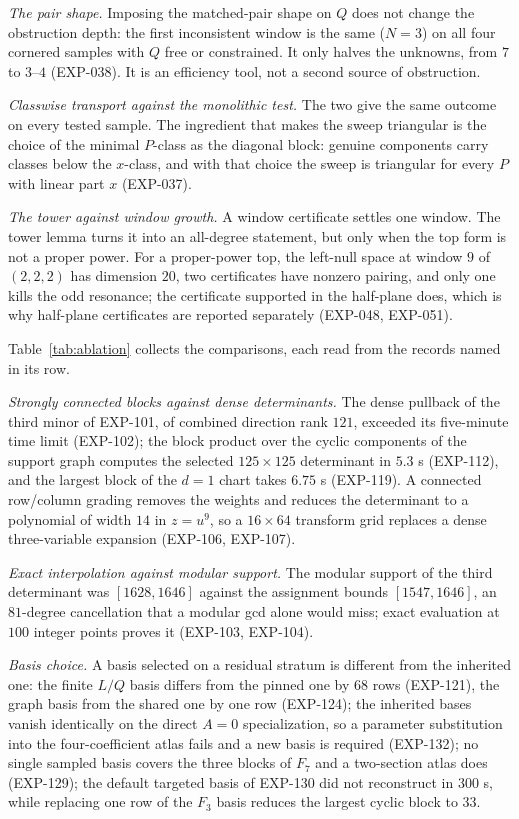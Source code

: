 \documentclass[11pt]{article}
\theoremstyle{remark}
\begin{document}
\emph{The pair shape.} Imposing the matched-pair shape on $Q$ does not change the obstruction depth: the first inconsistent window is the same ($N=3$) on all
four cornered samples with $Q$ free or constrained. It only halves the unknowns, from $7$ to $3$--$4$ (EXP-038). It is an efficiency tool, not a second source of
obstruction.

\emph{Classwise transport against the monolithic test.} The two give the same outcome on every tested sample. The ingredient that makes the sweep triangular is the choice of
the minimal $P$-class as the diagonal block: genuine components carry classes below the $x$-class, and with that choice the sweep is triangular for every $P$ with linear part $x$ (EXP-037).

\emph{The tower against window growth.} A window certificate settles one window. The tower lemma turns it into an all-degree statement, but only when the top form is not a
proper power. For a proper-power top, the left-null space at window $9$ of $(2,2,2)$ has dimension $20$, two certificates have nonzero pairing, and only one kills the odd resonance; the
certificate supported in the half-plane does, which is why half-plane certificates are reported separately (EXP-048, EXP-051).

Table~\ref{tab:ablation} collects the comparisons, each read from the records named in its row.



\emph{Strongly connected blocks against dense determinants.} The dense pullback of the third minor of EXP-101, of combined direction rank $121$, exceeded its five-minute time limit (EXP-102); the
block product over the cyclic components of the support graph computes the selected $125\times125$ determinant in $5.3$ s (EXP-112), and the largest block of the $d=1$ chart takes $6.75$ s
(EXP-119). A connected row/column grading removes the weights and reduces the determinant to a polynomial of width $14$ in $z=u^9$, so a $16\times64$ transform grid replaces a dense three-variable
expansion (EXP-106, EXP-107).

\emph{Exact interpolation against modular support.} The modular support of the third determinant was $[1628,1646]$ against the assignment bounds $[1547,1646]$, an $81$-degree cancellation that a
modular gcd alone would miss; exact evaluation at $100$ integer points proves it (EXP-103, EXP-104).

\emph{Basis choice.} A basis selected on a residual stratum is different from the inherited one: the finite $L/Q$ basis differs from the pinned one by $68$ rows (EXP-121), the graph basis from the shared one by one row
(EXP-124); the inherited bases vanish identically on the direct $A=0$ specialization, so a parameter substitution into the four-coefficient atlas fails and a new basis is required (EXP-132); no single sampled
basis covers the three blocks of $F_7$ and a two-section atlas does (EXP-129); the default targeted basis of EXP-130 did not reconstruct in $300$ s, while replacing one row of the $F_3$ basis reduces the largest cyclic block to $33$.
\end{document}
